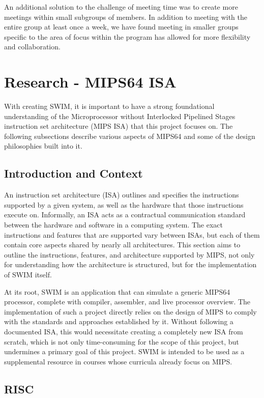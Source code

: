 \documentclass[
    paper=letter,
    parskip=half,
    fontsize=12pt,
    titlepage=firstiscover,
    toc=bibliography,
    numbers=endperiod
]{scrartcl}
\let\oldsection\section
\renewcommand{\section}{\newpage\oldsection}
\begin{document}
An additional solution to the challenge of meeting time was to create
more meetings within small subgroups of members. In addition to meeting
with the entire group at least once a week, we have found meeting in
smaller groups specific to the area of focus within the program has
allowed for more flexibility and collaboration.

\section{Research - MIPS64 ISA}

With creating SWIM, it is important to have a strong foundational
understanding of the Microprocessor without Interlocked Pipelined Stages
instruction set architecture (MIPS ISA) that this project focuses on.
The following subsections describe various aspects of MIPS64 and some of
the design philosophies built into it.

\subsection{Introduction and Context}

An instruction set architecture (ISA) outlines and specifies the
instructions supported by a given system, as well as the hardware that
those instructions execute on. Informally, an ISA acts as a contractual
communication standard between the hardware and software in a computing
system. The exact instructions and features that are supported vary
between ISAs, but each of them contain core aspects shared by nearly all
architectures. This section aims to outline the instructions, features,
and architecture supported by MIPS, not only for understanding how the
architecture is structured, but for the implementation of SWIM itself.

At its root, SWIM is an application that can simulate a generic MIPS64
processor, complete with compiler, assembler, and live processor
overview. The implementation of such a project directly relies on the
design of MIPS to comply with the standards and approaches established
by it. Without following a documented ISA, this would necessitate
creating a completely new ISA from scratch, which is not only
time-consuming for the scope of this project, but undermines a primary
goal of this project. SWIM is intended to be used as a supplemental
resource in courses whose curricula already focus on MIPS.

\subsection{RISC}
\end{document}
